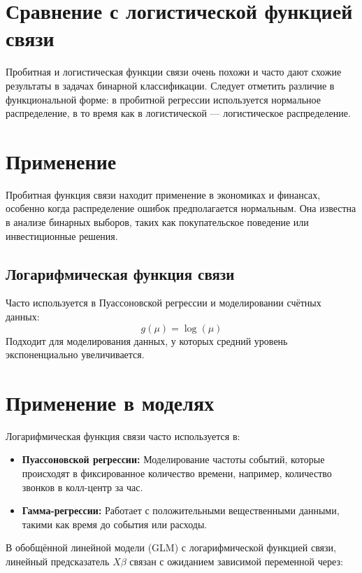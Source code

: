 \begin{itemize}
\section*{Сравнение с логистической функцией связи}

Пробитная и логистическая функции связи очень похожи и часто дают схожие результаты в задачах бинарной классификации. Следует отметить различие в функциональной форме: в пробитной регрессии используется нормальное распределение, в то время как в логистической — логистическое распределение.

\section*{Применение}

Пробитная функция связи находит применение в экономиках и финансах, особенно когда распределение ошибок предполагается нормальным. Она известна в анализе бинарных выборов, таких как покупательское поведение или инвестиционные решения.

\subsection*{Логарифмическая функция связи}

Часто используется в Пуассоновской регрессии и моделировании счётных данных:
\[
g(\mu) = \log(\mu)
\]
Подходит для моделирования данных, у которых средний уровень экспоненциально увеличивается.

\section*{Применение в моделях}

Логарифмическая функция связи часто используется в:

\begin{itemize}
    \item \textbf{Пуассоновской регрессии:} Моделирование частоты событий, которые происходят в фиксированное количество времени, например, количество звонков в колл-центр за час.
    \item \textbf{Гамма-регрессии:} Работает с положительными вещественными данными, такими как время до события или расходы.
\end{itemize}

В обобщённой линейной модели (GLM) с логарифмической функцией связи, линейный предсказатель \(X\beta\) связан с ожиданием зависимой переменной через:


\end{itemize}
